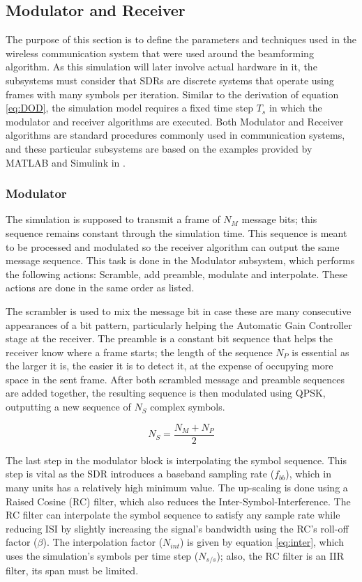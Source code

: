 \documentclass[12pt,a4paper]{report}
\begin{document}
\subsection{Modulator and Receiver} \label{met:sim:mod}
The purpose of this section is to define the parameters and techniques used in the wireless communication system that were used around the beamforming algorithm. As this simulation will later involve actual hardware in it, the subsystems must consider that SDRs are discrete systems that operate using frames with many symbols per iteration. Similar to the derivation of equation \ref{eq:DOD}, the simulation model requires a fixed time step $T_{s}$ in which the modulator and receiver algorithms are executed. Both Modulator and Receiver algorithms are standard procedures commonly used in communication systems, and these particular subsystems are based on the examples provided by MATLAB and Simulink in \cite{Mathworks2020QPSKKingdom}.

\subsubsection{Modulator} \label{met:sim:mod:mod}
The simulation is supposed to transmit a frame of $N_M$ message bits; this sequence remains constant through the simulation time. This sequence is meant to be processed and modulated so the receiver algorithm can output the same message sequence. This task is done in the Modulator subsystem, which performs the following actions: Scramble, add preamble, modulate and interpolate. These actions are done in the same order as listed.

The scrambler is used to mix the message bit in case these are many consecutive appearances of a bit pattern, particularly helping the Automatic Gain Controller stage at the receiver. The preamble is a constant bit sequence that helps the receiver know where a frame starts; the length of the sequence $N_P$ is essential as the larger it is, the easier it is to detect it, at the expense of occupying more space in the sent frame. After both scrambled message and preamble sequences are added together, the resulting sequence is then modulated using QPSK, outputting a new sequence of $N_S$ complex symbols.

\begin{equation}
    N_S = \frac{N_M + N_P}{2}
    \label{eq:nsym}
\end{equation}

The last step in the modulator block is interpolating the symbol sequence. This step is vital as the SDR introduces a baseband sampling rate ($f_{bb}$), which in many units has a relatively high minimum value. The up-scaling is done using a Raised Cosine (RC) filter, which also reduces the Inter-Symbol-Interference. The RC filter can interpolate the symbol sequence to satisfy any sample rate while reducing ISI by slightly increasing the signal's bandwidth using the RC's roll-off factor ($\beta$). The interpolation factor ($N_{int}$) is given by equation \ref{eq:inter}, which uses the simulation's symbols per time step ($N_{s/s}$); also, the RC filter is an IIR filter, its span must be limited.
\end{document}
